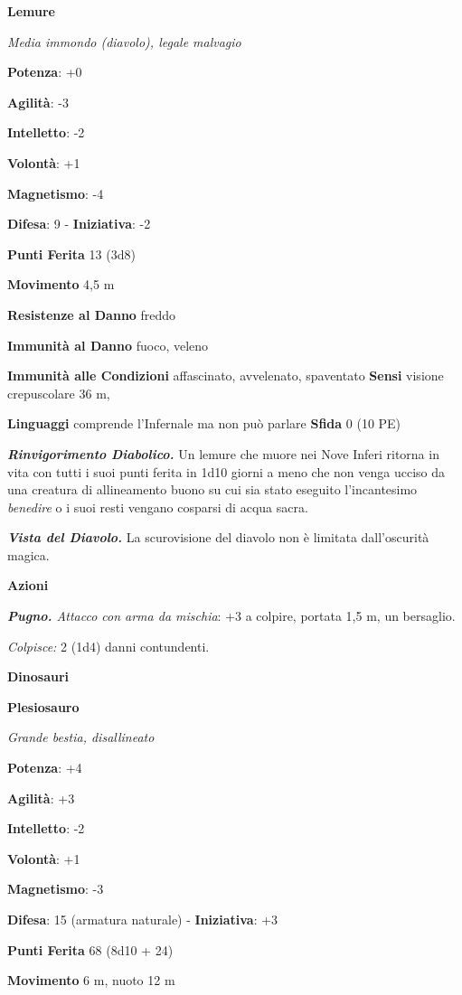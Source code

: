 \begin{multicols}{2}
\textbf{Lemure}

\emph{Media immondo (diavolo), legale malvagio}

\textbf{Potenza}: +0

\textbf{Agilità}: -3

\textbf{Intelletto}: -2

\textbf{Volontà}: +1

\textbf{Magnetismo}: -4

\textbf{Difesa}: 9 - \textbf{Iniziativa}: -2

\textbf{Punti Ferita} 13 (3d8)

\textbf{Movimento} 4,5 m

\textbf{Resistenze al Danno} freddo

\textbf{Immunità al Danno} fuoco, veleno

\textbf{Immunità alle Condizioni} affascinato, avvelenato, spaventato
\textbf{Sensi} visione crepuscolare 36 m, 

\textbf{Linguaggi} comprende l'Infernale ma non può parlare
\textbf{Sfida} 0 (10 PE)

\emph{\textbf{Rinvigorimento Diabolico.}} Un lemure che muore nei Nove
Inferi ritorna in vita con tutti i suoi punti ferita in 1d10 giorni a
meno che non venga ucciso da una creatura di allineamento buono su cui
sia stato eseguito l'incantesimo \emph{benedire} o i suoi resti vengano
cosparsi di acqua sacra.

\emph{\textbf{Vista del Diavolo.}} La scurovisione del diavolo non è
limitata dall'oscurità magica.

\textbf{Azioni}

\emph{\textbf{Pugno.} Attacco con arma da mischia}: +3 a colpire,
portata 1,5 m, un bersaglio.

\emph{Colpisce:} 2 (1d4) danni contundenti.

\textbf{Dinosauri}

\textbf{Plesiosauro}

\emph{Grande bestia, disallineato}

\textbf{Potenza}: +4

\textbf{Agilità}: +3

\textbf{Intelletto}: -2

\textbf{Volontà}: +1

\textbf{Magnetismo}: -3

\textbf{Difesa}: 15 (armatura naturale) - \textbf{Iniziativa}: +3

\textbf{Punti Ferita} 68 (8d10 + 24)

\textbf{Movimento} 6 m, nuoto 12 m


\end{multicols}
